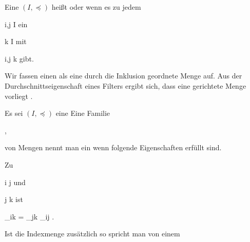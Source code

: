 {}
{





Eine
$(I, \preccurlyeq)$ heißt  oder  wenn es zu jedem

\mavergleichskette
{\vergleichskette
{ i,j
}
{ \in }{ I
}
{  }{
}
{    }{
}
{   }{
}
}
{}{}{}
ein

\mavergleichskette
{\vergleichskette
{ k
}
{ \in }{ I
}
{  }{
}
{    }{
}
{   }{
}
}
{}{}{}
mit

\mavergleichskette
{\vergleichskette
{  i,j
}
{ \preccurlyeq }{ k
}
{  }{
}
{    }{
}
{   }{
}
}
{}{}{}
gibt.





}

Wir fassen einen
als eine durch die Inklusion geordnete Menge auf. Aus der Durchschnittseigenschaft eines Filters ergibt sich, dass eine gerichtete Menge vorliegt
 {} {.}


{}
{





Es sei $(I,  \preccurlyeq)$ eine
Eine Familie

 { , }

von Mengen nennt man ein  wenn folgende Eigenschaften erfüllt sind.
 {Zu

\mavergleichskette
{\vergleichskette
{ i
}
{ \preccurlyeq }{ j
}
{  }{
}
{    }{
}
{   }{
}
}
{}{}{}
und

\mavergleichskette
{\vergleichskette
{ j
}
{ \preccurlyeq }{ k
}
{  }{
}
{    }{
}
{   }{
}
}
{}{}{}
ist

\mavergleichskette
{\vergleichskette
{ \varphi_{ik}
}
{ = }{ \varphi_{jk} \circ  \varphi_{ij}
}
{  }{
}
{    }{
}
{   }{
}
}
{}{}{.}
}
Ist die Indexmenge zusätzlich
so spricht man von einem 





}

